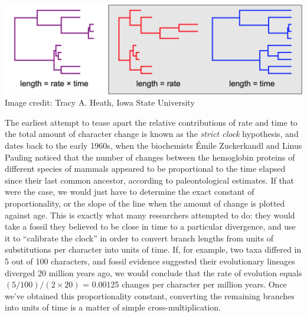 \documentclass[12pt]{article}
\begin{document}
\begin{center}
\includegraphics[width=\textwidth]{rate-vs-time.png} \\
\textcolor{gray!50!black}{\footnotesize Image credit: Tracy A. Heath, Iowa State University}
\end{center}

\noindent The earliest attempt to tease apart the relative contributions of rate and time to the total amount of character change is known as the \textit{strict clock} hypothesis, and dates back to the early 1960s, when the biochemists \'{E}mile Zuckerkandl and Linus Pauling noticed that the number of changes between the hemoglobin proteins of different species of mammals appeared to be proportional to the time elapsed since their last common ancestor, according to paleontological estimates. If that were the case, we would just have to determine the exact constant of proportionality, or the slope of the line when the amount of change is plotted against age. This is exactly what many researchers attempted to do: they would take a fossil they believed to be close in time to a particular divergence, and use it to ``calibrate the clock'' in order to convert branch lengths from units of substitutions per character into units of time. If, for example, two taxa differed in 5 out of 100 characters, and fossil evidence suggested their evolutionary lineages diverged 20 million years ago, we would conclude that the rate of evolution equals $(5/100)/(2 \times 20)$ = 0.00125 changes per character per million years. Once we've obtained this proportionality constant, converting the remaining branches into units of time is a matter of simple cross-multiplication. \\
\end{document}
